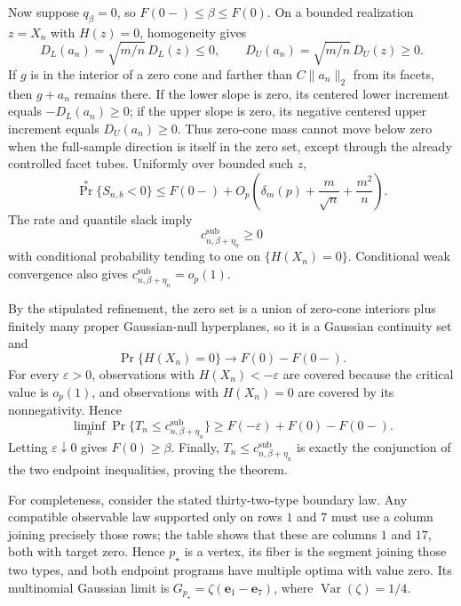Now suppose \(q_\beta=0\), so \(F(0-)\leq\beta\leq F(0)\).  On a bounded realization \(z=X_n\) with \(H(z)=0\), homogeneity gives
\[
D_L(a_n)=\sqrt{m/n}\,D_L(z)\leq0,\qquad
D_U(a_n)=\sqrt{m/n}\,D_U(z)\geq0.
\]
If \(g\) is in the interior of a zero cone and farther than \(C\|a_n\|_2\) from its facets, then \(g+a_n\) remains there.  If the lower slope is zero, its centered lower increment equals \(-D_L(a_n)\geq0\); if the upper slope is zero, its negative centered upper increment equals \(D_U(a_n)\geq0\).  Thus zero-cone mass cannot move below zero when the full-sample direction is itself in the zero set, except through the already controlled facet tubes.  Uniformly over bounded such \(z\),
\[
\Pr^*\{S_{n,b}<0\}
\leq F(0-)+O_p\!\left(\delta_m(p)+\frac m{\sqrt n}+\frac{m^2}{n}\right).
\]
The rate and quantile slack imply
\[
c^{\mathrm{sub}}_{n,\beta+\eta_n}\geq0
\]
with conditional probability tending to one on \(\{H(X_n)=0\}\).  Conditional weak convergence also gives \(c^{\mathrm{sub}}_{n,\beta+\eta_n}=o_p(1)\).

By the stipulated refinement, the zero set is a union of zero-cone interiors plus finitely many proper Gaussian-null hyperplanes, so it is a Gaussian continuity set and
\[
\Pr\{H(X_n)=0\}\to F(0)-F(0-).
\]
For every \(\varepsilon>0\), observations with \(H(X_n)<-\varepsilon\) are covered because the critical value is \(o_p(1)\), and observations with \(H(X_n)=0\) are covered by its nonnegativity.  Hence
\[
\liminf_n\Pr\{T_n\leq c^{\mathrm{sub}}_{n,\beta+\eta_n}\}
\geq F(-\varepsilon)+F(0)-F(0-).
\]
Letting \(\varepsilon\downarrow0\) gives \(F(0)\geq\beta\).  Finally, \(T_n\leq c^{\mathrm{sub}}_{n,\beta+\eta_n}\) is exactly the conjunction of the two endpoint inequalities, proving the theorem.

For completeness, consider the stated thirty-two-type boundary law.  Any compatible observable law supported only on rows \(1\) and \(7\) must use a column joining precisely those rows; the table shows that these are columns \(1\) and \(17\), both with target zero.  Hence \(p_\star\) is a vertex, its fiber is the segment joining those two types, and both endpoint programs have multiple optima with value zero.  Its multinomial Gaussian limit is \(G_{p_\star}=\zeta(\mathbf e_1-\mathbf e_7)\), where \(\operatorname{Var}(\zeta)=1/4\).


